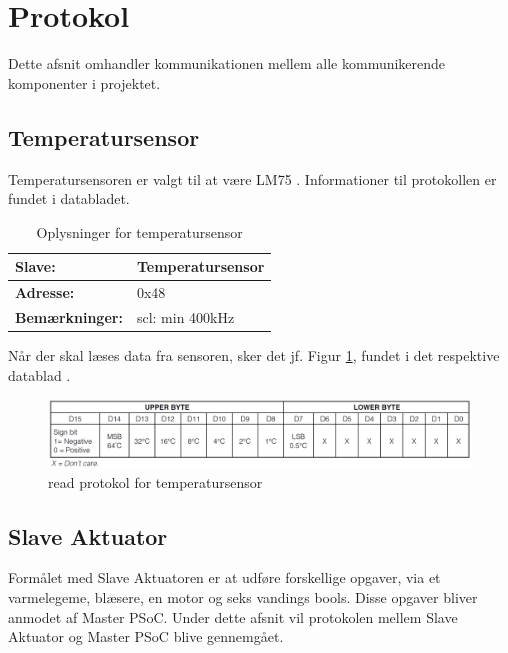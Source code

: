 \section{\IIC Protokol} \label{sec:I2C_protokol}
Dette afsnit omhandler kommunikationen mellem alle \IIC kommunikerende komponenter i projektet.

\subsection{Temperatursensor}
Temperatursensoren er valgt til at være LM75 \cite{lib:LM75}. Informationer til protokollen er fundet i databladet.

\begin{table}[h]
\centering
\begin{tabularx}{0.6\textwidth}{| X | X |} 			\hline
\textbf{Slave:} 		& Temperatursensor			\\ \hline
\textbf{Adresse:}		& 0x48						\\ \hline
\textbf{Bemærkninger:}	& scl: min 400kHz			\\ \hline
\end{tabularx}
\caption{\IIC Oplysninger for temperatursensor}
\label{tbl:I2CTempLuftOplysninger}
\end{table}

Når der skal læses data fra sensoren, sker det jf. Figur \ref{fig:I2CTempProtokol}, fundet i det respektive datablad \cite{lib:LM75}.

\begin{figure}[h]
\centering
\includegraphics[width=\textwidth - 1 cm]{../fig/LM75Bitsekvens.png}
\caption{\IIC read protokol for temperatursensor}
\label{fig:I2CTempProtokol}
\end{figure}

\clearpage

\subsection{Slave Aktuator}
Formålet med Slave Aktuatoren er at udføre forskellige opgaver, via et varmelegeme, blæsere, en motor og seks vandings bools. Disse opgaver bliver anmodet af Master PSoC. Under dette afsnit vil protokolen mellem Slave Aktuator og Master PSoC blive gennemgået.

